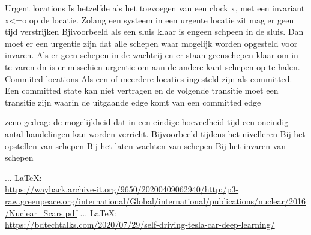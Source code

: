\begin{thebibliography}{99}
{{%
%
%
%
%
%
%

Urgent locations
Is hetzelfde als het toevoegen van een clock x, met een invariant x<=o op de locatie. Zolang een systeem in een urgente locatie zit mag er geen tijd verstrijken
Bjivoorbeeld als een sluis klaar is engeen schpeen in de sluis. Dan moet er een urgentie zijn dat alle schepen waar mogelijk worden opgesteld voor invaren. Als er geen schepen in de wachtrij en er staan geenschepen klaar om in te varen dn is er misschien urgentie om aan de andere kant schepen op te halen.
Commited locations
Als een of meerdere locaties ingesteld zijn als committed. Een committed state kan niet vertragen  en de volgende transitie moet een transitie zijn waarin de uitgaande edge komt van een committed edge


zeno gedrag: de mogelijkheid dat in een eindige hoeveelheid tijd een oneindig antal handelingen kan worden verricht.
Bijvoorbeeld tijdens het nivelleren
Bij het opstellen van schepen
Bij het laten wachten van schepen
Bij het invaren van schepen



 ... \LaTeX:\\ \url{https://wayback.archive-it.org/9650/20200409062940/http:/p3-raw.greenpeace.org/international/Global/international/publications/nuclear/2016/Nuclear_Scars.pdf}
 ... \LaTeX:\\ \url{https://bdtechtalks.com/2020/07/29/self-driving-tesla-car-deep-learning/}



}}
\end{thebibliography}
